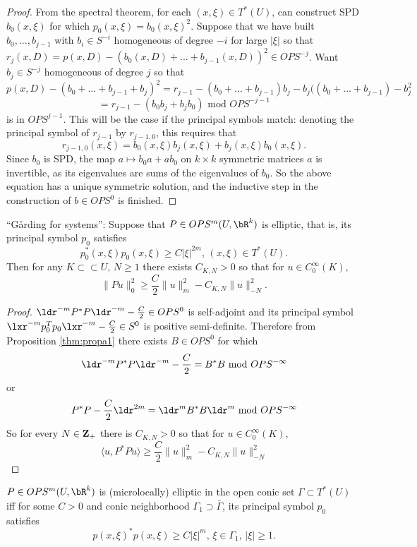 \begin{proof}
  From the spectral theorem, for each $(x,\xi) \in T^*(U)$, can construct SPD $b_0(x,\xi)$ for which $p_0(x,\xi) = b_0(x,\xi)^2$. Suppose that we have built $b_0,...,b_{j-1}$ with $b_i \in S^{-i}$ homogeneous of degree $-i$ for large $|\xi|$ so that
  $r_{j}(x,D) = p(x,D) - (b_0(x,D) +...+ b_{j-1}(x,D))^2 \in OPS^{-j}$. Want $b_j \in S^{-j}$ homogeneous of degree $j$ so that
  \[
    p(x,D)-(b_0 +...+ b_{j-1}+b_j)^2 = r_{j-1} -  (b_0 +...+ b_{j-1})b_j - b_j((b_0 +...+ b_{j-1}) - b_j^2
  \]
  \[
    = r_{j-1} - (b_0 b_j+b_j b_0) \mbox{ mod } OPS^{-j-1}
  \]
  is in $OPS^{j-1}$. This will be the case if the principal symbols match: denoting the principal symbol of $r_{j-1}$ by $r_{j-1,0}$, this requires that
  \[
    r_{j-1,0}(x,\xi) = b_0(x,\xi)b_j(x,\xi) + b_j(x,\xi)b_0(x,\xi).
  \]
  Since $b_0$ is SPD, the map $a \mapsto b_0a+ab_0$ on $k \times k$ symmetric matrices $a$ is invertible, as its eigenvalues are sums of the eigenvalues of $b_0$. So the above equation has a unique symmetric solution, and the inductive step in the construction of $b \in OPS^0$ is finished.
\end{proof}
  
\begin{theorem}
  \label{thm:garding}
  ``G\r{a}rding for systems'': Suppose that $P \in OPS^m(U,\bR^k)$ is elliptic, that is, its principal symbol $p_0$ satisfies 
\[
  p_0^*(x,\xi)p_0(x,\xi) \ge C|\xi|^{2m}, \, (x,\xi) \in T^*(U).
\]
Then for any $K \subset \subset U$, $N \ge 1$ there exists $C_{K,N} > 0$ so that for $u \in C^{\infty}_0(K)$, 
\[
  \|Pu\|^2_0 \ge \frac{C}{2}\|u\|^2_m - C_{K,N}\|u\|^2_{-N}.
\]
\end{theorem}

\begin{proof}
$\ldr^{-m}P^*P\ldr^{-m} - \frac{C}{2} \in OPS^0$ is self-adjoint  and its principal symbol $\lxr^{-m}p_0^Tp_0\lxr^{-m} - \frac{C}{2} \in S^0$ is positive semi-definite. Therefore from Proposition \ref{thm:propa1} there exists $B \in OPS^0$ for which
  \[
    \ldr^{-m}P^*P\ldr^{-m} - \frac{C}{2} = B^*B \mbox{ mod } OPS^{-\infty}
  \]
  or
  \[
    P^*P -\frac{C}{2} \ldr^{2m} = \ldr^m B^*B \ldr^m \mbox{ mod } OPS^{-\infty}
  \]
  So for every $N  \in {\bf Z}_+$ there is $C_{K,N} > 0$ so that for $u \in C_0^{\infty}(K)$,  
  \[
    \langle u,P^*P u \rangle \ge \frac{C}{2}\|u\|_m^2 -   C_{K,N}\|u\|^2_{-N}
  \]
  
\end{proof}

\begin{definition} $P \in OPS^m(U,\bR^k)$ is (microlocally) elliptic in the open conic set $\Gamma \subset T^*(U)$ iff for some $C>0$ and conic neighborhood $\Gamma_1 \supset \bar{\Gamma}$, its principal symbol $p_0$ satisfies
  \[
    p(x,\xi)^*p(x,\xi) \ge C|\xi|^m, \, \xi \in \Gamma_1, \, |\xi| \ge 1.
  \]
\end{definition}

